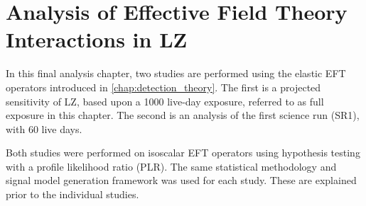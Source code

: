 \chapter{Analysis of Effective Field Theory Interactions in LZ}
\label{chap:analysis_eft_work}
In this final analysis chapter, two studies are performed using the elastic EFT operators introduced in \autoref{chap:detection_theory}.
The first is a projected sensitivity of LZ, based upon a 1000 live-day exposure, referred to as full exposure in this chapter.
The second is an analysis of the first science run (SR1), with 60 live days.
\par
Both studies were performed on isoscalar EFT operators using hypothesis testing with a profile likelihood ratio (PLR).
The same statistical methodology and signal model generation framework was used for each study.
These are explained prior to the individual studies.



%






\clearpage


%

%

